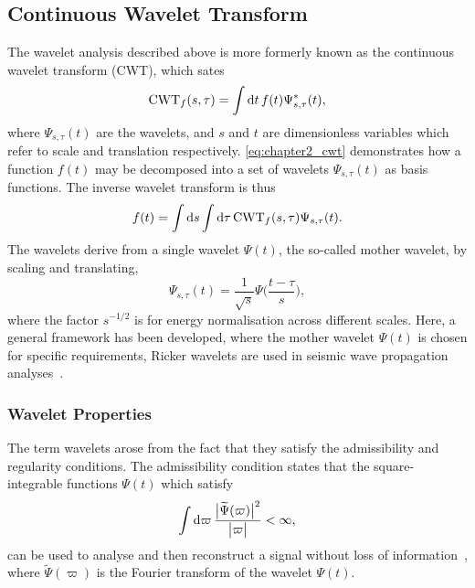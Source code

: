 \subsection{Continuous Wavelet Transform}\label{sec:chapter2_continuous_wavelet_transform}

The wavelet analysis described above is more formerly known as the continuous wavelet transform (CWT), which sates
%
\begin{equation}\label{eq:chapter2_cwt}
	\text{CWT}_{f}(s,\tau)
	= \int \dd{t} f(t) \Psi_{s,\tau}^{\ast}(t),
\end{equation}
%
where \(\Psi_{s,\tau}(t)\) are the wavelets, and \(s\) and \(t\) are dimensionless variables which refer to scale and translation respectively.
\cref{eq:chapter2_cwt} demonstrates how a function \(f(t)\) may be decomposed into a set of wavelets \(\Psi_{s,\tau}(t)\) as basis functions.
The inverse wavelet transform is thus
%
\begin{equation}
	f(t)
	= \int \dd{s} \int \dd{\tau} \text{CWT}_{f}(s,\tau) \Psi_{s,\tau}(t).
\end{equation}
%
The wavelets derive from a single wavelet \(\Psi(t)\), the so-called mother wavelet, by scaling and translating, \ie{}
%
\begin{equation}\label{eq:mother_wavelet}
	\Psi_{s,\tau}(t)
	= \frac{1}{\sqrt{s}} \Psi\bigg(\frac{t-\tau}{s}\bigg),
\end{equation}
%
where the factor \(s^{-1/2}\) is for energy normalisation across different scales.
Here, a general framework has been developed, where the mother wavelet \(\Psi(t)\) is chosen for specific requirements, \eg{} Ricker wavelets are used in seismic wave propagation analyses~\cite{Wang2014}.

\subsubsection{Wavelet Properties}

The term wavelets arose from the fact that they satisfy the admissibility and regularity conditions.
The admissibility condition states that the square-integrable functions \(\Psi(t)\) which satisfy
%
\begin{equation}
	\int \dd{\varpi} \frac{\big\lvert\widetilde{\Psi}(\varpi)\big\rvert^{2}}{\big\lvert\varpi\big\rvert}
	< \infty,
\end{equation}
%
can be used to analyse and then reconstruct a signal without loss of information~\cite{Sheng2010}, where \(\widetilde{\Psi}(\varpi)\) is the Fourier transform of the wavelet \(\Psi(t)\).

